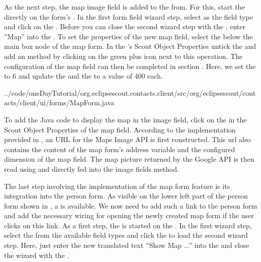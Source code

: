 \documentclass[a4paper,10pt,twoside]{book}
\begin{document}
As the next step, the map image field is added to the from. 
For this, start the  directly on the form's . 
In the first form field wizard step, select  as the field type and click on the . 
Before you can close the second wizard step with the , enter ''Map'' into the . 
To set the properties of the new map field, select the  below the main box node of the map form. 
In the 's Scout Object Properties untick the  and add an  method by clicking on the green plus icon next to this operation. 
The configuration of the map field can then be completed in section . 
Here, we set the  to 6 and update the  and the  to a value of 400 each.


{../code/oneDayTutorial/org.eclipsescout.contacts.client/src/org/eclipsescout/contacts/client/ui/forms/MapForm.java}

To add the Java code to display the map in the image field, click on the  in the Scout Object Properties of the map field. 
According to the implementation provided in , an URL for the Maps Image API is first constructed. 
This url also contains the content of the map form's address variable and the configured dimension of the map field. 
The map picture returned by the Google API is then read using  and directly fed into the image fields  method. 

The last step involving the implementation of the map form feature is its integration into the person form. 
As visible on the lower left part of the person form shown in , a  is available. 
We now need to add such a link to the person form and add the necessary wiring for opening the newly created map form if the user clicks on this link. 
As a first step, the  is started on the . 
In the first wizard step, select the  from the available field types and click the  to load the second wizard step. 
Here, just enter the new translated text ''Show Map ...'' into the  and close the wizard with the . 
\end{document}
